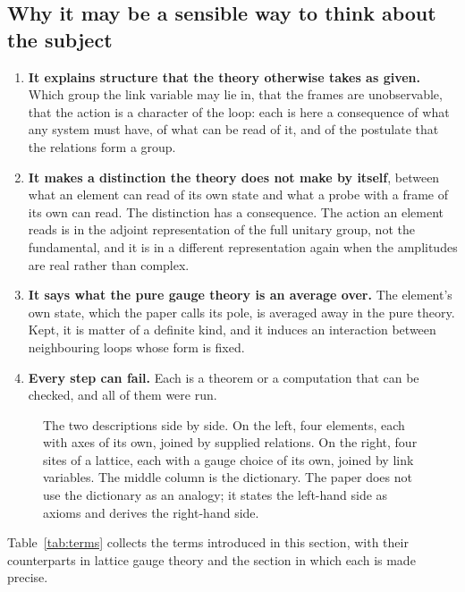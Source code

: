 \documentclass[11pt,a4paper]{article}
\theoremstyle{plain}
\theoremstyle{definition}
\theoremstyle{remark}
\begin{document}
\subsection{Why it may be a sensible way to think about the subject}

\begin{enumerate}[leftmargin=2em, itemsep=3pt]
\item \textbf{It explains structure that the theory otherwise takes as given.} Which group the link variable may lie in, that the frames are unobservable, that the action is a character of the loop: each is here a consequence of what any system must have, of what can be read of it, and of the postulate that the relations form a group.
\item \textbf{It makes a distinction the theory does not make by itself}, between what an element can read of its own state and what a probe with a frame of its own can read. The distinction has a consequence. The action an element reads is in the adjoint representation of the full unitary group, not the fundamental, and it is in a different representation again when the amplitudes are real rather than complex.
\item \textbf{It says what the pure gauge theory is an average over.} The element's own state, which the paper calls its pole, is averaged away in the pure theory. Kept, it is matter of a definite kind, and it induces an interaction between neighbouring loops whose form is fixed.
\item \textbf{Every step can fail.} Each is a theorem or a computation that can be checked, and all of them were run.
\end{enumerate}

\begin{figure}[!htbp]
\centering

\caption{The two descriptions side by side. On the left, four elements, each with axes of its own, joined by supplied relations. On the right, four sites of a lattice, each with a gauge choice of its own, joined by link variables. The middle column is the dictionary. The paper does not use the dictionary as an analogy; it states the left-hand side as axioms and derives the right-hand side.}
\label{fig:correspondence}
\end{figure}

Table~\ref{tab:terms} collects the terms introduced in this section, with their counterparts in lattice gauge theory and the section in which each is made precise.
\end{document}

